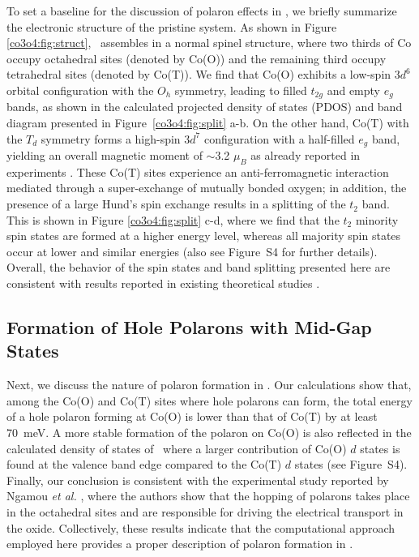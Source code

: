 To set a baseline for the discussion of polaron effects in \co, we briefly summarize the electronic structure of the pristine system. As shown in Figure \ref{co3o4:fig:struct}, \co\ assembles in a normal spinel structure, where two thirds of Co occupy octahedral sites (denoted by Co(O)) and the remaining third occupy tetrahedral sites (denoted by Co(T)). We find that Co(O) exhibits a low-spin $3d^6$ orbital configuration with the $O_h$ symmetry, leading to filled $t_{2g}$ and empty $e_g$ bands, as shown in the calculated projected density of states (PDOS) and band diagram presented in Figure~\ref{co3o4:fig:split} a-b. On the other hand, Co(T) with the $T_d$ symmetry forms a high-spin $3d^7$ configuration with a half-filled $e_g$ band, yielding an overall magnetic moment of $\sim$3.2 $\mu_B$ as already reported in experiments \cite{roth1964}. These Co(T) sites experience an anti-ferromagnetic interaction mediated through a super-exchange of mutually bonded oxygen; in addition, the presence of a large Hund's spin exchange results in a splitting of the $t_{2}$ band. This is shown in Figure \ref{co3o4:fig:split} c-d, where we find that the $t_{2}$ minority spin states are formed at a higher energy level, whereas all majority spin states occur at lower and similar energies \cite{lima2014,chen2011} (also see Figure~S4 for further details). Overall, the behavior of the spin states and band splitting presented here are consistent with results reported in existing theoretical studies \cite{chen2011,wu2016}.

\subsection{Formation of Hole Polarons with Mid-Gap States}

Next, we discuss the nature of polaron formation in \co. Our calculations show that, among the Co(O) and Co(T) sites where hole polarons can form, the total energy of a hole polaron forming at Co(O) is lower than that of Co(T) by at least 70~meV. A more stable formation of the polaron on Co(O) is also reflected in the calculated density of states of \co\, where a larger contribution of Co(O) $d$ states is found at the valence band edge compared to the Co(T) $d$ states (see Figure~S4). Finally, our conclusion is consistent with the experimental study reported by Ngamou \textit{et al.} \cite{ngamou2010}, where the authors show that the hopping of polarons takes place in the octahedral sites and are responsible for driving the electrical transport in the oxide. Collectively, these results indicate that the computational approach employed here provides a proper description of polaron formation in \co.

